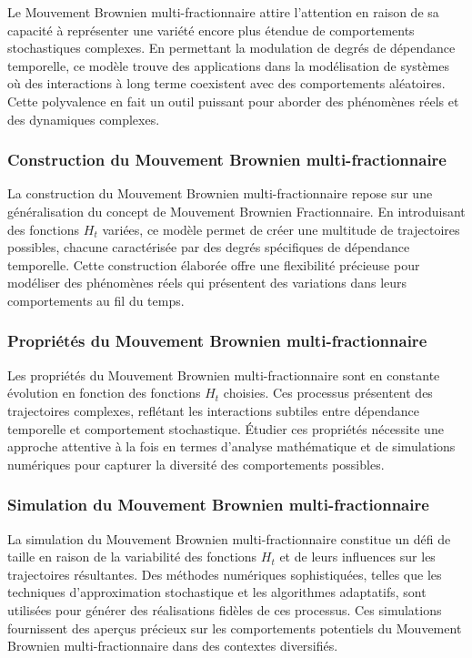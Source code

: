 Le Mouvement Brownien multi-fractionnaire attire l'attention en raison de sa capacité à représenter une variété encore plus étendue de comportements stochastiques complexes. En permettant la modulation de degrés de dépendance temporelle, ce modèle trouve des applications dans la modélisation de systèmes où des interactions à long terme coexistent avec des comportements aléatoires. Cette polyvalence en fait un outil puissant pour aborder des phénomènes réels et des dynamiques complexes.

\subsubsection{Construction du Mouvement Brownien multi-fractionnaire}

La construction du Mouvement Brownien multi-fractionnaire repose sur une généralisation du concept de Mouvement Brownien Fractionnaire. En introduisant des fonctions $H_t$ variées, ce modèle permet de créer une multitude de trajectoires possibles, chacune caractérisée par des degrés spécifiques de dépendance temporelle. Cette construction élaborée offre une flexibilité précieuse pour modéliser des phénomènes réels qui présentent des variations dans leurs comportements au fil du temps.

\subsubsection{Propriétés du Mouvement Brownien multi-fractionnaire}

Les propriétés du Mouvement Brownien multi-fractionnaire sont en constante évolution en fonction des fonctions $H_t$ choisies. Ces processus présentent des trajectoires complexes, reflétant les interactions subtiles entre dépendance temporelle et comportement stochastique. Étudier ces propriétés nécessite une approche attentive à la fois en termes d'analyse mathématique et de simulations numériques pour capturer la diversité des comportements possibles.

\subsubsection{Simulation du Mouvement Brownien multi-fractionnaire}

La simulation du Mouvement Brownien multi-fractionnaire constitue un défi de taille en raison de la variabilité des fonctions $H_t$ et de leurs influences sur les trajectoires résultantes. Des méthodes numériques sophistiquées, telles que les techniques d'approximation stochastique et les algorithmes adaptatifs, sont utilisées pour générer des réalisations fidèles de ces processus. Ces simulations fournissent des aperçus précieux sur les comportements potentiels du Mouvement Brownien multi-fractionnaire dans des contextes diversifiés.